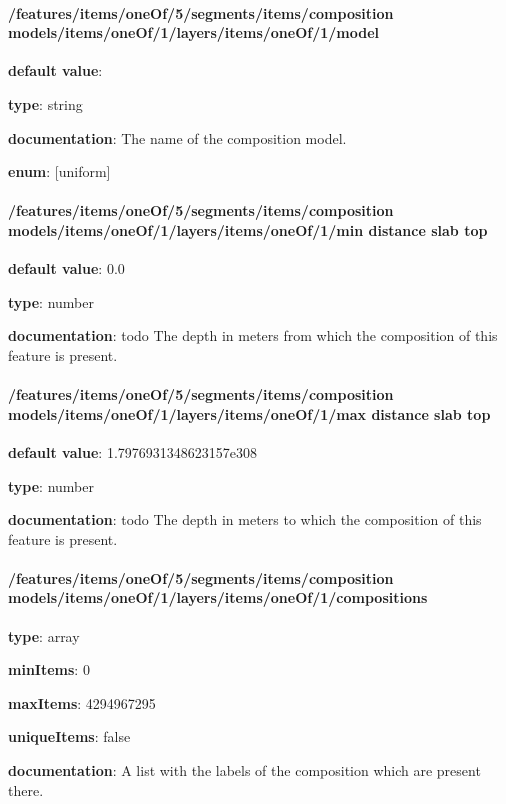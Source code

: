 \paragraph{/features/items/oneOf/5/segments/items/composition models/items/oneOf/1/layers/items/oneOf/1/model} \begin{itemized}
\item {\bf default value}: 
\item {\bf type}: string
\item {\bf documentation}: The name of the composition model.
\item {\bf enum}: [uniform]\end{itemized}\paragraph{/features/items/oneOf/5/segments/items/composition models/items/oneOf/1/layers/items/oneOf/1/min distance slab top} \begin{itemized}
\item {\bf default value}: 0.0
\item {\bf type}: number
\item {\bf documentation}: todo The depth in meters from which the composition of this feature is present.
\end{itemized}\paragraph{/features/items/oneOf/5/segments/items/composition models/items/oneOf/1/layers/items/oneOf/1/max distance slab top} \begin{itemized}
\item {\bf default value}: 1.7976931348623157e308
\item {\bf type}: number
\item {\bf documentation}: todo The depth in meters to which the composition of this feature is present.
\end{itemized}\paragraph{/features/items/oneOf/5/segments/items/composition models/items/oneOf/1/layers/items/oneOf/1/compositions} \begin{itemized}
\item {\bf type}: array
\item {\bf minItems}: 0
\item {\bf maxItems}: 4294967295
\item {\bf uniqueItems}: false
\item {\bf documentation}: A list with the labels of the composition which are present there.

\end{itemized}
